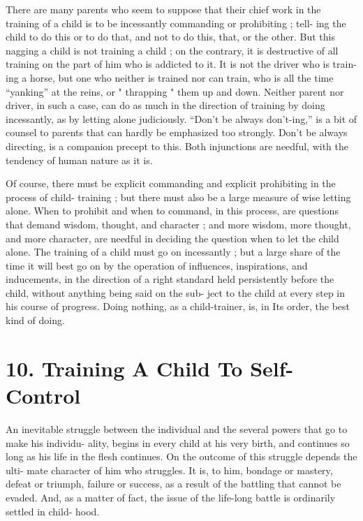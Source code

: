 \documentclass[
]{book}
\begin{document}
There are many parents who seem to suppose that their chief work in the training of a child is to be incessantly commanding or prohibiting ; tell- ing the child to do this or to do that, and not to do this, that, or the other. But this nagging a child is not training a child ; on the contrary, it is destructive of all training on the part of him who is addicted to it. It is not the driver who is train- ing a horse, but one who neither is trained nor can train, who is all the time ``yanking'' at the reins, or " thrapping " them up and down. Neither parent nor driver, in such a case, can do as much in the direction of training by doing incessantly, as by letting alone judiciously. ``Don't be always don't-ing,'' is a bit of counsel to parents that can hardly be emphasized too strongly. Don't be always directing, is a companion precept to this. Both injunctions are needful, with the tendency of human nature as it is.

Of course, there must be explicit commanding and explicit prohibiting in the process of child- training ; but there must also be a large measure of wise letting alone. When to prohibit and when to command, in this process, are questions that demand wisdom, thought, and character ; and more wisdom, more thought, and more character, are needful in deciding the question when to let the child alone. The training of a child must go on incessantly ; but a large share of the time it will best go on by the operation of influences, inspirations, and inducements, in the direction of a right standard held persistently before the child, without anything being said on the sub- ject to the child at every step in his course of progress. Doing nothing, as a child-trainer, is, in Its order, the best kind of doing.

\hypertarget{training-a-child-to-self-control}{%
\chapter{10. Training A Child To Self-Control}\label{training-a-child-to-self-control}}

An inevitable struggle between the individual and the several powers that go to make his individu- ality, begins in every child at his very birth, and continues so long as his life in the flesh continues. On the outcome of this struggle depends the ulti- mate character of him who struggles. It is, to him, bondage or mastery, defeat or triumph, failure or success, as a result of the battling that cannot be evaded. And, as a matter of fact, the issue of the life-long battle is ordinarily settled in child- hood.
\end{document}

